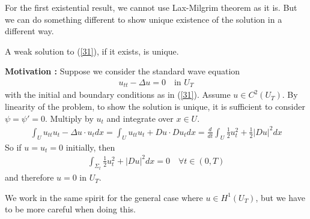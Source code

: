 \documentclass[12pt,a4paper]{report}
\begin{document}
For the first existential result, we cannot use Lax-Milgrim theorem as it is. But we can do something different to show unique existence of the solution in a different way.
\s

\thm A weak solution to (\ref{31}), if it exists, is unique.
\s

\textbf{Motivation :} Suppose we consider the standard wave equation
\begin{align*}
u_{tt}  - \Delta u = 0 \quad \text{in } U_T
\end{align*}
with the initial and boundary conditions as in (\ref{31}). Assume $u\in C^2(U_T)$. By linearity of the problem, to show the solution is unique, it is sufficient to consider $\psi= \psi' =0$. Multiply by $u_t$ and integrate over $x\in U$.
\begin{align*}
\int_U u_{tt} u_t - \Delta u \cdot u_t dx =  \int_U u_{tt} u_t + Du \cdot Du_t dx = \frac{d}{dt} \int_U \frac{1}{2} u_t^2 + \frac{1}{2} |Du|^2 dx
\end{align*}
So if $u=u_t =0$ initially, then 
\begin{align*}
\int_{\Sigma_t} \frac{1}{2} u_t^2 + |Du|^2 dx =0 \quad \forall t\in (0,T)
\end{align*}
and therefore $u=0$ in $U_T$.

\quad We work in the same spirit for the general case where $u \in H^1(U_T)$, but we have to be more careful when doing this.
\s
\end{document}
